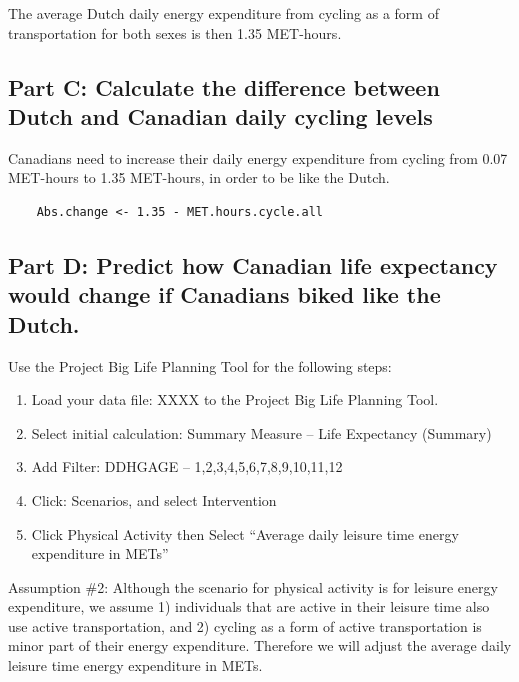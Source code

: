 \documentclass[]{book}
\begin{document}
The average Dutch daily energy expenditure from cycling as a form of
transportation for both sexes is then 1.35 MET-hours.

\subsection{Part C: Calculate the difference between Dutch and Canadian
daily cycling
levels}\label{part-c-calculate-the-difference-between-dutch-and-canadian-daily-cycling-levels}

Canadians need to increase their daily energy expenditure from cycling
from 0.07 MET-hours to 1.35 MET-hours, in order to be like the Dutch.

\begin{verbatim}
    Abs.change <- 1.35 - MET.hours.cycle.all
\end{verbatim}

\subsection{Part D: Predict how Canadian life expectancy would change if
Canadians biked like the
Dutch.}\label{part-d-predict-how-canadian-life-expectancy-would-change-if-canadians-biked-like-the-dutch.}

Use the Project Big Life Planning Tool for the following steps:

\begin{enumerate}
\def\labelenumi{\arabic{enumi}.}
\item
  Load your data file: XXXX to the Project Big Life Planning Tool.
\item
  Select initial calculation: Summary Measure -- Life Expectancy
  (Summary)
\item
  Add Filter: DDHGAGE -- 1,2,3,4,5,6,7,8,9,10,11,12
\item
  Click: Scenarios, and select Intervention
\item
  Click Physical Activity then Select ``Average daily leisure time
  energy expenditure in METs''
\end{enumerate}

Assumption \#2: Although the scenario for physical activity is for
leisure energy expenditure, we assume 1) individuals that are active in
their leisure time also use active transportation, and 2) cycling as a
form of active transportation is minor part of their energy expenditure.
Therefore we will adjust the average daily leisure time energy
expenditure in METs.
\end{document}
